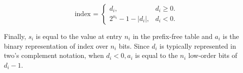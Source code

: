 \begin{equation*}
    \text{index = } 
    \begin{cases}
        d_i, & d_i \geq 0. \\
        2^{n_i}-1-|d_i|, & d_i<0.
    \end{cases}
\end{equation*}

Finally, $s_i$ is equal to the value at entry $n_i$ in the prefix-free table and $a_i$ is the binary representation of index over $n_i$ bits. Since $d_i$ is typically represented in two's complement notation, when $d_i<0, a_i$ is equal to the $n_i$ low-order bits of $d_i - 1$.
